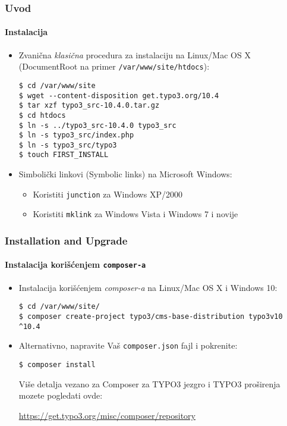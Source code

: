 
\begin{frame}[fragile]
	\frametitle{Uvod}
	\framesubtitle{Instalacija}

	\begin{itemize}
	\item Zvanična \textit{klasična} procedura za instalaciju na Linux/Mac OS X
		(DocumentRoot na primer \texttt{/var/www/site/htdocs}):
\begin{lstlisting}
$ cd /var/www/site
$ wget --content-disposition get.typo3.org/10.4
$ tar xzf typo3_src-10.4.0.tar.gz
$ cd htdocs
$ ln -s ../typo3_src-10.4.0 typo3_src
$ ln -s typo3_src/index.php
$ ln -s typo3_src/typo3
$ touch FIRST_INSTALL
\end{lstlisting}

\item Simbolički linkovi (Symbolic links) na Microsoft Windows:

	\begin{itemize}
		\item Koristiti \texttt{junction} za Windows XP/2000
		\item Koristiti \texttt{mklink} za Windows Vista i Windows 7 i novije
	\end{itemize}

	\end{itemize}
\end{frame}


\begin{frame}[fragile]
	\frametitle{Installation and Upgrade}
	\framesubtitle{Instalacija korišćenjem \texttt{composer-a}}

	\begin{itemize}
		\item Instalacija korišćenjem \textit{composer-a} na Linux/Mac OS X i Windows 10:
\begin{lstlisting}
$ cd /var/www/site/
$ composer create-project typo3/cms-base-distribution typo3v10 ^10.4
\end{lstlisting}

		\item Alternativno, napravite Vaš \texttt{composer.json} fajl i pokrenite:
\begin{lstlisting}
$ composer install
\end{lstlisting}

			Više detalja vezano za Composer za TYPO3 jezgro i TYPO3 proširenja
			mozete pogledati ovde:

			\small
				\href{https://get.typo3.org/misc/composer/repository}{https://get.typo3.org/misc/composer/repository}
			\normalsize

	\end{itemize}
\end{frame}

